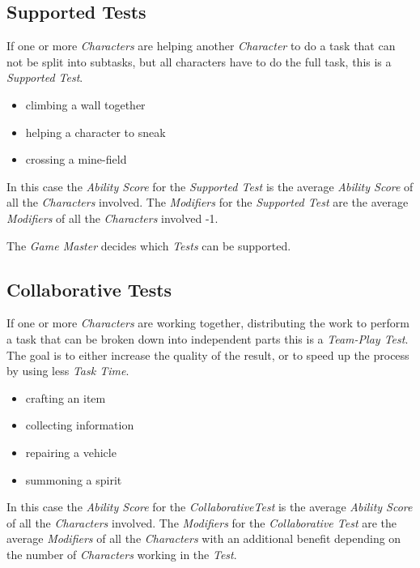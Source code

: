 \subsection{Supported Tests}

If one or more \emph{Characters} are helping another \emph{Character} to do a task
that can not be split into subtasks, but all characters have to do the full task,
this is a \emph{Supported Test}.

\begin{itemize}[parsep=0em]
    \item climbing a wall together
    \item helping a character to sneak
    \item crossing a mine-field
\end{itemize}

In this case the \emph{Ability Score} for the \emph{Supported Test} is the average
\emph{Ability Score} of all the \emph{Characters} involved. The \emph{Modifiers}
for the \emph{Supported Test} are the average
\emph{Modifiers} of all the \emph{Characters} involved -1.

The \emph{Game Master} decides which \emph{Tests} can be supported.

\subsection{Collaborative Tests}

If one or more \emph{Characters} are working together, distributing the work to
perform a task that can be broken down into independent parts this is a
\emph{Team-Play Test}. The goal is to either increase the quality of the result, or
to speed up the process by using less \emph{Task Time}.

\begin{itemize}[parsep=0em]
    \item crafting an item
    \item collecting information
    \item repairing a vehicle
    \item summoning a spirit
\end{itemize}

In this case the \emph{Ability Score} for the \emph{CollaborativeTest} is the average
\emph{Ability Score} of all the \emph{Characters} involved. The \emph{Modifiers}
for the \emph{Collaborative Test} are the average
\emph{Modifiers} of all the \emph{Characters} with an additional benefit depending
on the number of \emph{Characters} working in the \emph{Test}.

